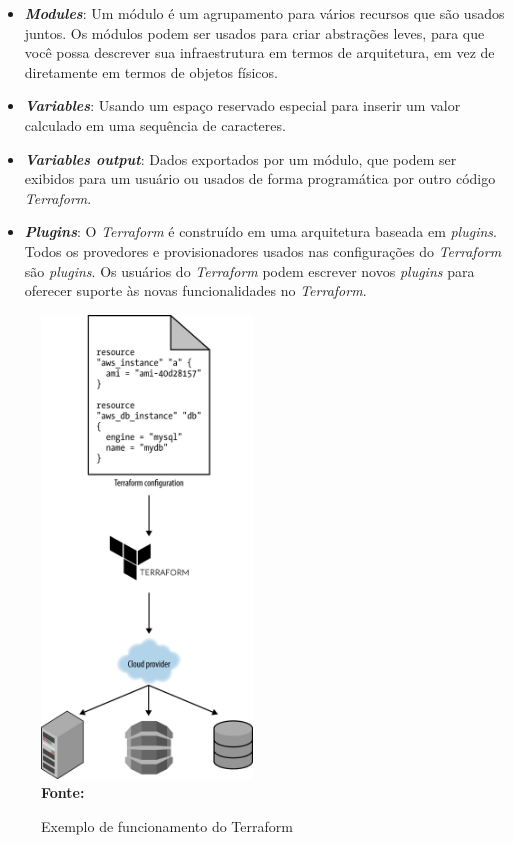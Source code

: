 \begin{itemize}
\item \textbf{\textit{Modules}}: Um módulo é um agrupamento para vários recursos que são usados juntos. Os módulos podem ser usados para criar abstrações leves, para que você possa descrever sua infraestrutura em termos de arquitetura, em vez de diretamente em termos de objetos físicos.

\item \textbf{\textit{Variables}}: Usando um espaço reservado especial para inserir um valor calculado em uma sequência de caracteres. 

 \item \textbf{\textit{Variables output}}: Dados exportados por um módulo, que podem ser exibidos para um usuário  ou usados de forma programática por outro código \textit{Terraform}.
 
 \item \textbf{\textit{Plugins}}: O \textit{Terraform} é construído em uma arquitetura baseada em \textit{plugins}. Todos os provedores e provisionadores usados nas configurações do \textit{Terraform} são \textit{plugins}. Os usuários do \textit{Terraform} podem escrever novos \textit{plugins} para oferecer suporte às novas funcionalidades no \textit{Terraform}.
 \end{itemize}
  \cite{hashcorp2}
  \begin{figure}[H]
	\centering	
	\caption[\hspace{0.1cm}Exemplo de funcionamento do Terraform]{Exemplo de funcionamento do Terraform}
	\vspace{-0.4cm}
	\includegraphics[width=0.5\textwidth]{figuras/terraform-working.png}
	 \vspace{-0.2cm}
	\\\textbf{\footnotesize Fonte: \cite{oreilly}}
	\label{fig:figura8}
\end{figure}
\vspace{-0.5cm}


